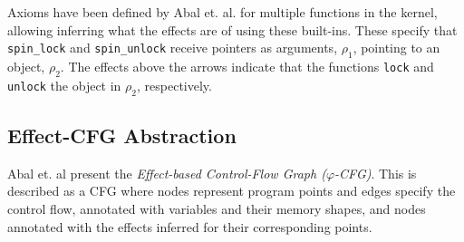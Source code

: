 \newpar Axioms have been defined by Abal et. al. for multiple functions in the kernel, allowing inferring what the effects are of using these built-ins. These specify that \texttt{spin\_lock} and \texttt{spin\_unlock} receive pointers as arguments, $\rho_1$, pointing to an object, $\rho_2$. The effects above the arrows indicate that the functions \texttt{lock} and \texttt{unlock} the object in $\rho_2$, respectively.

\subsection{Effect-CFG Abstraction}
Abal et. al present the \textit{Effect-based Control-Flow Graph ($\varphi$-CFG)}. This is described as a CFG where nodes represent program points and edges specify the control flow, annotated with variables and their memory shapes, and nodes annotated with the effects inferred for their corresponding points. 